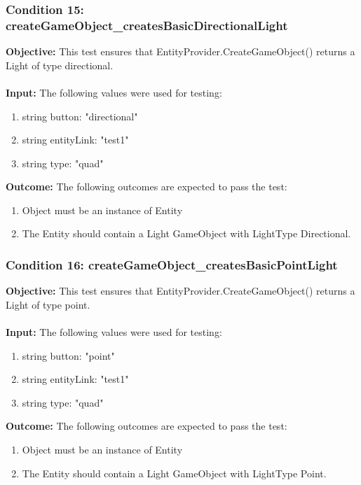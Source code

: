 \documentclass[a4paper,12pt]{article}
\begin{document}
		\subsubsection{Condition 15: createGameObject\_createsBasicDirectionalLight}
			\textbf{Objective:} This test ensures that EntityProvider.CreateGameObject() returns a Light of type directional.\\\\
			\textbf{Input:} The following values were used for testing:
				\begin{enumerate}
					\item string button: "directional"
					\item string entityLink: "test1"
					\item string type: "quad"
				\end{enumerate}
			\textbf{Outcome:} The following outcomes are expected to pass the test:
				\begin{enumerate}
					\item Object must be an instance of Entity
					\item The Entity should contain a Light GameObject with LightType Directional.
				\end{enumerate}
		\subsubsection{Condition 16: createGameObject\_createsBasicPointLight}
			\textbf{Objective:} This test ensures that EntityProvider.CreateGameObject() returns a Light of type point.\\\\
			\textbf{Input:} The following values were used for testing:
				\begin{enumerate}
					\item string button: "point"
					\item string entityLink: "test1"
					\item string type: "quad"
				\end{enumerate}
			\textbf{Outcome:} The following outcomes are expected to pass the test:
				\begin{enumerate}
					\item Object must be an instance of Entity
					\item The Entity should contain a Light GameObject with LightType Point.
				\end{enumerate}
\end{document}
